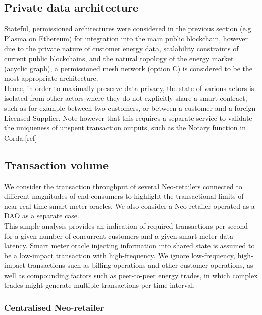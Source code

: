 \documentclass{article}
\theoremstyle{definition}
\theoremstyle{plain} %
\begin{document}
\subsection{Private data architecture}

Stateful, permissioned architectures were considered in the previous section (e.g. Plasma on Ethereum) for integration into the main public blockchain, however due to the private nature of customer energy data, scalability constraints of current public blockchains, and the natural topology of the energy market (acyclic graph), a permissioned mesh network (option C) is considered to be the most appropriate architecture.\\

\noindent Hence, in order to maximally preserve data privacy, the state of various actors is isolated from other actors where they do not explicitly share a smart contract, such as for example between two customers, or between a customer and a foreign Licensed Supplier. Note however that this requires a separate service to validate the uniqueness of unspent transaction outputs, such as the Notary function in Corda.[ref]

\subsection{Transaction volume}

\noindent We consider the transaction throughput of several Neo-retailers connected to different magnitudes of end-consumers to highlight the transactional limits of near-real-time smart meter oracles. We also consider a Neo-retailer operated as a DAO as a separate case. \\

\noindent This simple analysis provides an indication of required transactions per second for a given number of concurrent customers and a given smart meter data latency. Smart meter oracle injecting information into shared state is assumed to be a low-impact transaction with high-frequency. We ignore low-frequency, high-impact transactions such as billing operations and other customer operations, as well as compounding factors such as peer-to-peer energy trades, in which complex trades might generate multiple transactions per time interval.

\subsubsection{Centralised Neo-retailer}
\end{document}
